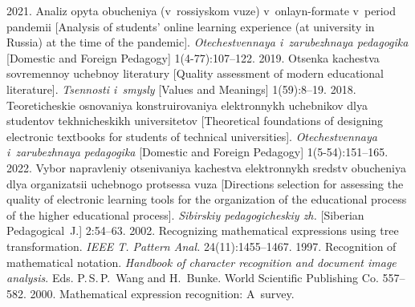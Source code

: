   \begin{multicols}{2}

\renewcommand{\bibname}{\protect\rmfamily References}

{\small\frenchspacing
 {%
 \begin{thebibliography}{99}
 
 
 2021. Analiz opy\-ta obuche\-niya (v~ros\-siy\-skom vu\-ze) v~on\-layn-for\-ma\-te 
v~pe\-ri\-od pan\-de\-mii [Analysis of students' online learning experience (at university in Russia) at the time 
of the pandemic]. 
\textit{Otechestvennaya i~zarubezhnaya pedagogika} [Domestic and Foreign Pedagogy]  
1(4-77):107--122.
 2019. Otsen\-ka ka\-chest\-va sov\-re\-men\-noy ucheb\-noy li\-te\-ra\-tu\-ry 
[Quality assessment of modern educational literature]. \textit{Tsennosti i~smysly} [Values and Meanings] 1(59):8--19.
 2018. Teo\-re\-ti\-che\-skie osno\-va\-niya kons\-tru\-i\-ro\-va\-niya elekt\-ron\-nykh ucheb\-ni\-kov 
dlya stu\-den\-tov tekh\-ni\-che\-skikh uni\-ver\-si\-te\-tov [Theoretical foundations of designing electronic textbooks 
for students of technical universities]. \textit{Otechestvennaya i~zarubezhnaya pedagogika} [Domestic 
and Foreign Pedagogy] 1(5-54):151--165.
 2022. Vy\-bor na\-prav\-le\-niy otse\-ni\-va\-niya 
ka\-chest\-va elekt\-ron\-nykh sredstv obuche\-niya dlya or\-ga\-ni\-za\-tsii ucheb\-no\-go pro\-tses\-sa vu\-za [Directions 
selection for assessing the quality of electronic learning tools for the organization of the educational 
process of the higher educational process]. \textit{Sibirskiy pedagogicheskiy zh.} [Siberian 
Pedagogical~J.] 2:54--63.
 2002. Recognizing mathematical expressions using 
tree transformation. \textit{IEEE T. Pattern Anal.} 24(11):1455--1467.
 1997. Recognition of mathematical notation. \textit{Handbook of 
character recognition and document image analysis}. Eds. P.\,S.\,P.~Wang and H.~Bunke. World 
Scientific Publishing Co. 557--582.
 2000. Mathematical expression recognition: A~survey. 

\end{thebibliography}}}
\end{multicols}
